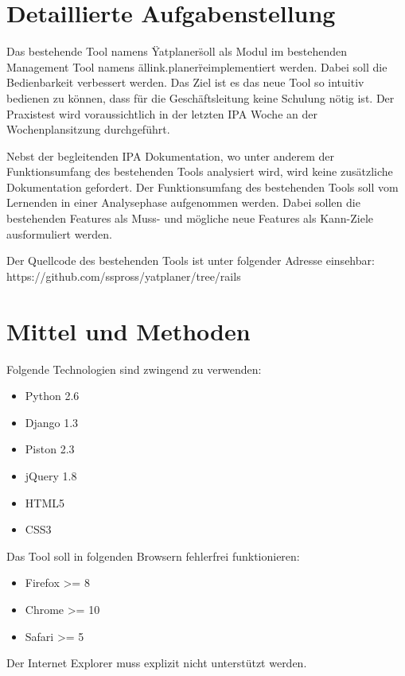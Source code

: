 \section{Detaillierte Aufgabenstellung}
    
Das bestehende Tool namens \"Yatplaner\" soll als Modul im bestehenden Management Tool namens \"allink.planer\" reimplementiert werden. Dabei soll die Bedienbarkeit verbessert werden. Das Ziel ist es das neue Tool so intuitiv bedienen zu können, dass für die Geschäftsleitung keine Schulung nötig ist. Der Praxistest wird voraussichtlich in der letzten IPA Woche an der Wochenplansitzung durchgeführt.

Nebst der begleitenden IPA Dokumentation, wo unter anderem der Funktionsumfang des bestehenden Tools analysiert wird, wird keine zusätzliche Dokumentation gefordert. Der Funktionsumfang des bestehenden Tools soll vom Lernenden in einer Analysephase aufgenommen werden. Dabei sollen die bestehenden Features als Muss- und mögliche neue Features als Kann-Ziele ausformuliert werden.

Der Quellcode des bestehenden Tools ist unter folgender Adresse einsehbar: \\https://github.com/sspross/yatplaner/tree/rails

\section{Mittel und Methoden}
Folgende Technologien sind zwingend zu verwenden:

\begin{itemize}
    \item  Python 2.6
    \item  Django 1.3
    \item  Piston 2.3
    \item  jQuery 1.8
    \item  HTML5
    \item  CSS3
\end{itemize}

Das Tool soll in folgenden Browsern fehlerfrei funktionieren:

\begin{itemize}
    \item Firefox >= 8
    \item Chrome >= 10
    \item Safari >= 5
\end{itemize}

Der Internet Explorer muss explizit nicht unterstützt werden.
    
